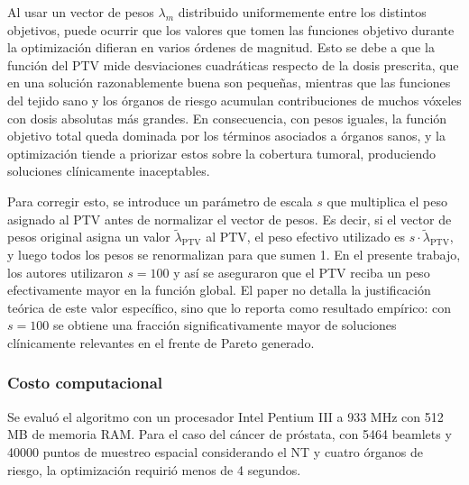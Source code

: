 Al usar un vector de pesos \(\lambda_m\) distribuido uniformemente entre los distintos objetivos, puede ocurrir que los valores que tomen las funciones objetivo durante la optimización difieran en varios órdenes de magnitud. Esto se debe a que la función del PTV mide desviaciones cuadráticas respecto de la dosis prescrita, que en una solución razonablemente buena son pequeñas, mientras que las funciones del tejido sano y los órganos de riesgo acumulan contribuciones de muchos vóxeles con dosis absolutas más grandes. En consecuencia, con pesos iguales, la función objetivo total queda dominada por los términos asociados a órganos sanos, y la optimización tiende a priorizar estos sobre la cobertura tumoral, produciendo soluciones clínicamente inaceptables.
 
Para corregir esto, se introduce un parámetro de escala \(s\) que multiplica el peso asignado al PTV antes de normalizar el vector de pesos. Es decir, si el vector de pesos original asigna un valor \(\tilde{\lambda}_{\text{PTV}}\) al PTV, el peso efectivo utilizado es \(s \cdot \tilde{\lambda}_{\text{PTV}}\), y luego todos los pesos se renormalizan para que sumen 1. En el presente trabajo, los autores utilizaron \(s = 100\) y así se aseguraron que el PTV reciba un peso efectivamente mayor en la función global. El paper no detalla la justificación teórica de este valor específico, sino que lo reporta como resultado empírico: con \(s = 100\) se obtiene una fracción significativamente mayor de soluciones clínicamente relevantes en el frente de Pareto generado.

\subsubsection*{Costo computacional}

Se evaluó el algoritmo con un procesador Intel Pentium III a 933 MHz con 512 MB de memoria RAM. Para el caso del cáncer de próstata, con 5464 beamlets y 40000 puntos de muestreo espacial considerando el NT y cuatro órganos de riesgo, la optimización requirió menos de 4 segundos.